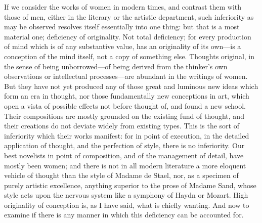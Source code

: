 \documentclass[12pt]{report}
\begin{document}
If we consider the works of women in modern times, and contrast them with those of men, either in the literary or the artistic department, such inferiority as may be observed resolves itself essentially into one thing: but that is a most material one; deficiency of originality. Not total deficiency; for every production of mind which is of any substantive value, has an originality of its own—is a conception of the mind itself, not a copy of something else. Thoughts original, in the sense of being unborrowed—of being derived from the thinker's own observations or intellectual processes—are abundant in the writings of women. But they have not yet produced any of those great and luminous new ideas which form an era in thought, nor those fundamentally new conceptions in art, which open a vista of possible effects not before thought of, and found a new school. Their compositions are mostly grounded on the existing fund of thought, and their creations do not deviate widely from existing types. This is the sort of inferiority which their works manifest: for in point of execution, in the detailed application of thought, and the perfection of style, there is no inferiority. Our best novelists in point of composition, and of the management of detail, have mostly been women; and there is not in all modern literature a more eloquent vehicle of thought than the style of Madame de Stael, nor, as a specimen of purely artistic excellence, anything superior to the prose of Madame Sand, whose style acts upon the nervous system like a symphony of Haydn or Mozart. High originality of conception is, as I have said, what is chiefly wanting. And now to examine if there is any manner in which this deficiency can be accounted for.
\end{document}
